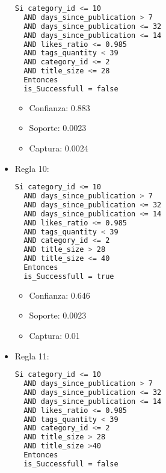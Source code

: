 \begin{itemize}
\begin{lstlisting}[language=bash, numbers=none]
  Si category_id <= 10
  AND days_since_publication > 7
  AND days_since_publication <= 32
  AND days_since_publication <= 14
  AND likes_ratio <= 0.985
  AND tags_quantity < 39
  AND category_id <= 2
  AND title_size <= 28
  Entonces
  is_Successfull = false
\end{lstlisting}

    \begin{itemize}
      \item Confianza: 0.883
      \item Soporte: 0.0023
      \item Captura: 0.0024
    \end{itemize}

  \item Regla 10:

\begin{lstlisting}[language=bash, numbers=none]
  Si category_id <= 10
  AND days_since_publication > 7
  AND days_since_publication <= 32
  AND days_since_publication <= 14
  AND likes_ratio <= 0.985
  AND tags_quantity < 39
  AND category_id <= 2
  AND title_size > 28
  AND title_size <= 40
  Entonces
  is_Successfull = true

\end{lstlisting}

    \begin{itemize}
      \item Confianza: 0.646
      \item Soporte: 0.0023
      \item Captura: 0.01
    \end{itemize}

  \item Regla 11:

\begin{lstlisting}[language=bash, numbers=none]
  Si category_id <= 10
  AND days_since_publication > 7
  AND days_since_publication <= 32
  AND days_since_publication <= 14
  AND likes_ratio <= 0.985
  AND tags_quantity < 39
  AND category_id <= 2
  AND title_size > 28
  AND title_size >40
  Entonces
  is_Successfull = false
\end{lstlisting}


\end{itemize}

